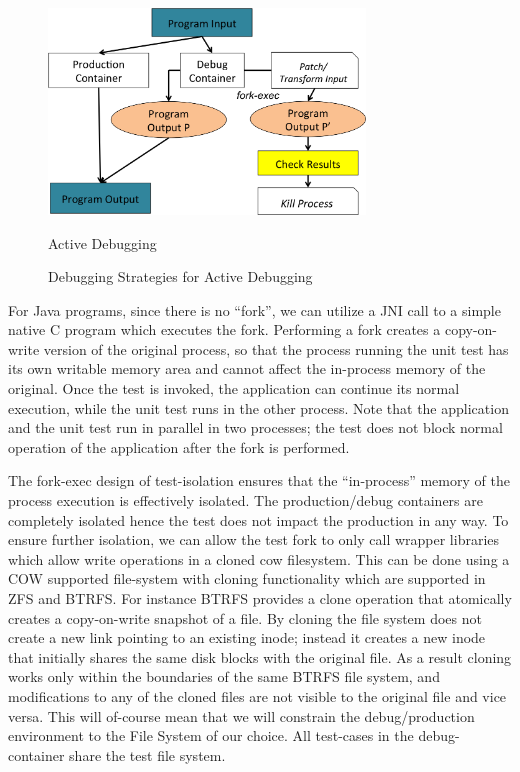 \begin{figure}[h]
	\centering
	\includegraphics[width=0.75\textwidth]{guided/figs/active-debugging.png}
	\caption{Active Debugging}
	\label{fig:active-debugging}
	\caption{Debugging Strategies for Active Debugging}
\end{figure}

For Java programs, since there is no “fork”, we can utilize a JNI call to a simple native C program which executes the fork. 
Performing a fork creates a copy-on-write version of the original process, so that the process running the unit test has its own writable memory area and cannot affect the in-process memory of the original. 
Once the test is invoked, the application can continue its normal execution, while the unit test runs in the other process. 
Note that the application and the unit test run in parallel in two processes; the test does not block normal operation of the application after the fork is performed.

The fork-exec design of test-isolation ensures that the ``in-process'' memory of the process execution is effectively isolated. 
The production/debug containers are completely isolated hence the test does not impact the production in any way. 
To ensure further isolation, we can allow the test fork to only call wrapper libraries which allow write operations in a cloned cow filesystem.
This can be done using a COW supported file-system with cloning functionality which are supported in ZFS and BTRFS.
For instance BTRFS provides a clone operation that atomically creates a copy-on-write snapshot of a file. By cloning the file system does not create a new link pointing to an existing inode; instead it creates a new inode that initially shares the same disk blocks with the original file. As a result cloning works only within the boundaries of the same BTRFS file system, and modifications to any of the cloned files are not visible to the original file and vice versa. 
This will of-course mean that we will constrain the debug/production environment to the File System of our choice.
All test-cases in the debug-container share the test file system.


